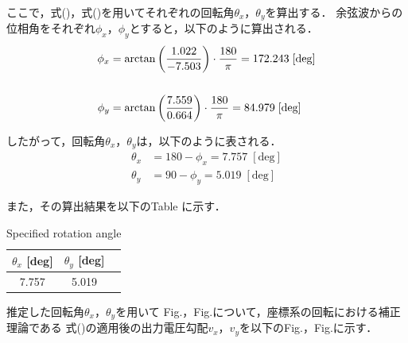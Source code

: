 ここで，式()，式()を用いてそれぞれの回転角$\theta_x$，$\theta_y$を算出する．
余弦波からの位相角をそれぞれ$\phi_x$，$\phi_y$とすると，以下のように算出される．
\begin{align}
	\phi_x &= \arctan \left(\frac{1.022}{-7.503}\right) \cdot \frac{180}{\pi} = 172.243\; [\mathrm{deg}]\\
  \notag \\
	\phi_y &= \arctan \left(\frac{7.559}{0.664}\right) \cdot \frac{180}{\pi} = 84.979\; [\mathrm{deg}]
\end{align}

したがって，回転角$\theta_x$，$\theta_y$は，以下のように表される．
\begin{align}
	\theta_x &= 180 - \phi_x = 7.757 \; [\mathrm{deg}]\\
	\theta_y &= 90 - \phi_y = 5.019 \; [\mathrm{deg}]
\end{align}

また，その算出結果を以下のTable に示す．

\begin{table}[htbp]
  \begin{center}
      \caption{Specified rotation angle}
      \begin{tabular}{|p{30mm}|p{20mm}|p{20mm}|}
          \hline
          \multicolumn{1}{|c|}{$\theta_x$ [deg]} & \multicolumn{1}{|c|}{$\theta_y$ [deg]} \\ \hline
          \multicolumn{1}{|c|}{7.757}           & \multicolumn{1}{|c|}{5.019}           \\ \hline
      \end{tabular}
  \end{center}
\end{table}

\newpage
推定した回転角$\theta_x$，$\theta_y$を用いて
Fig.，Fig.について，座標系の回転における補正理論である
式()の適用後の出力電圧勾配$v_x$，$v_y$を以下のFig.，Fig.に示す．

